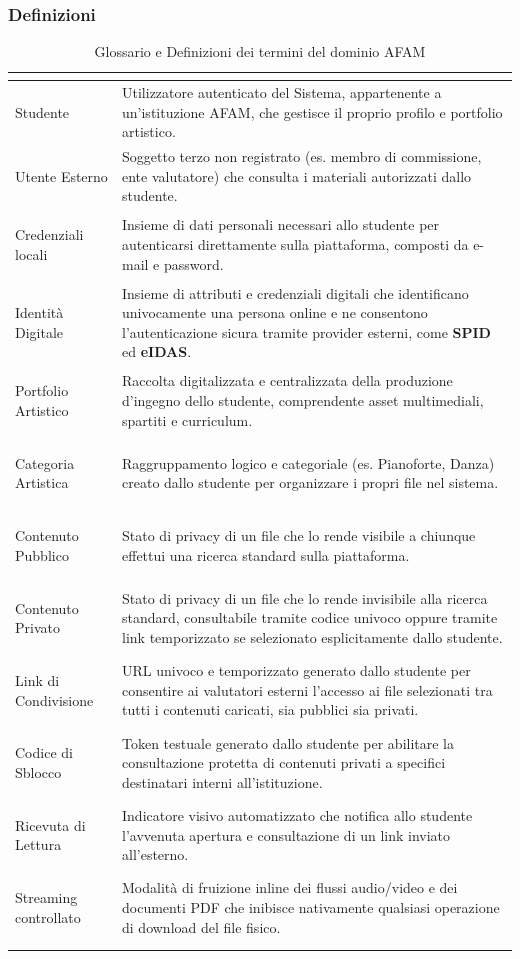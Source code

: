 \documentclass[12pt,a4paper]{article}
\begin{document}
\subsubsection{Definizioni}
\small
\begin{longtable}{|
>{\columncolor{unipablue}\color{white}\bfseries\raggedright\arraybackslash}p{3.4cm}|
>{\raggedright\arraybackslash}p{11.1cm}|}
\hline
\multicolumn{1}{|c|}{\cellcolor{unipablue}\color{white}\rule{0pt}{2.7ex}\textbf{TERMINE}} &
\multicolumn{1}{c|}{\rule{0pt}{2.7ex}\textbf{SIGNIFICATO}} \\
\hline
Studente & Utilizzatore autenticato del Sistema, appartenente a un'istituzione AFAM, che gestisce il proprio profilo e portfolio artistico. \\ \hline
Utente Esterno & Soggetto terzo non registrato (es. membro di commissione, ente valutatore) che consulta i materiali autorizzati dallo studente. \\ \hline
Credenziali locali & Insieme di dati personali necessari allo studente per autenticarsi direttamente sulla piattaforma, composti da e-mail e password. \\ \hline
Identità Digitale & Insieme di attributi e credenziali digitali che identificano univocamente una persona online e ne consentono l'autenticazione sicura tramite provider esterni, come \textbf{SPID} ed \textbf{eIDAS}. \\ \hline
Portfolio Artistico & Raccolta digitalizzata e centralizzata della produzione d'ingegno dello studente, comprendente asset multimediali, spartiti e curriculum. \\ \hline
Categoria Artistica & Raggruppamento logico e categoriale (es. Pianoforte, Danza) creato dallo studente per organizzare i propri file nel sistema. \\ \hline
Contenuto Pubblico & Stato di privacy di un file che lo rende visibile a chiunque effettui una ricerca standard sulla piattaforma. \\ \hline
Contenuto Privato & Stato di privacy di un file che lo rende invisibile alla ricerca standard, consultabile tramite codice univoco oppure tramite link temporizzato se selezionato esplicitamente dallo studente. \\ \hline
Link di Condivisione & URL univoco e temporizzato generato dallo studente per consentire ai valutatori esterni l'accesso ai file selezionati tra tutti i contenuti caricati, sia pubblici sia privati. \\ \hline
Codice di Sblocco & Token testuale generato dallo studente per abilitare la consultazione protetta di contenuti privati a specifici destinatari interni all'istituzione. \\ \hline
Ricevuta di Lettura & Indicatore visivo automatizzato che notifica allo studente l'avvenuta apertura e consultazione di un link inviato all'esterno. \\ \hline
Streaming controllato & Modalità di fruizione inline dei flussi audio/video e dei documenti PDF che inibisce nativamente qualsiasi operazione di download del file fisico. \\ \hline
\caption{Glossario e Definizioni dei termini del dominio AFAM}
\label{tab:definizioni_sistema}\\
\end{longtable}
\end{document}
